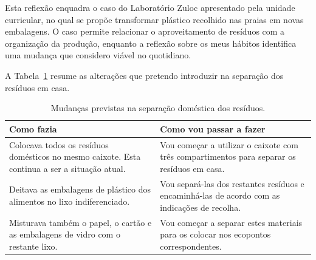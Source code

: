 Esta reflexão enquadra o caso do Laboratório Zuloc apresentado pela
unidade curricular, no qual se propõe transformar plástico recolhido nas
praias em novas embalagens. O caso permite relacionar o aproveitamento
de resíduos com a organização da produção, enquanto a reflexão sobre os
meus hábitos identifica uma mudança que considero viável no quotidiano.

A Tabela~\ref{tab:habitos} resume as alterações que pretendo introduzir
na separação dos resíduos em casa.

\begin{table}[h!]
\caption{Mudanças previstas na separação doméstica dos resíduos.}
\label{tab:habitos}

\vspace{0.2cm}

\begin{tabularx}{\textwidth}{|X|X|}
\hline
\textbf{Como fazia}
&
\textbf{Como vou passar a fazer}
\\
\hline

Colocava todos os resíduos domésticos no mesmo caixote.
Esta continua a ser a situação atual.
&
Vou começar a utilizar o caixote com três compartimentos
para separar os resíduos em casa.
\\
\hline

Deitava as embalagens de plástico dos alimentos
no lixo indiferenciado.
&
Vou separá-las dos restantes resíduos e encaminhá-las
de acordo com as indicações de recolha.
\\
\hline

Misturava também o papel, o cartão e as embalagens
de vidro com o restante lixo.
&
Vou começar a separar estes materiais para os colocar
nos ecopontos correspondentes.
\\
\hline
\end{tabularx}

\end{table}